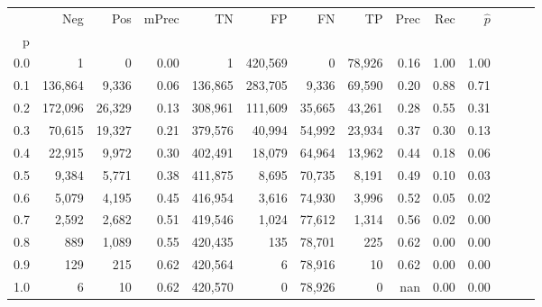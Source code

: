 \begin{tabular}{rrrrrrrrrrrrrr}
\toprule
{} &      Neg &     Pos & mPrec &       TN &       FP &      FN &      TP &  Prec &   Rec & $\hat{p}$ \\
p   &          &         &       &          &          &         &         &       &       &           \\
\midrule
0.0 &        1 &       0 &  0.00 &        1 &  420,569 &       0 &  78,926 &  0.16 &  1.00 &      1.00 \\
0.1 &  136,864 &   9,336 &  0.06 &  136,865 &  283,705 &   9,336 &  69,590 &  0.20 &  0.88 &      0.71 \\
0.2 &  172,096 &  26,329 &  0.13 &  308,961 &  111,609 &  35,665 &  43,261 &  0.28 &  0.55 &      0.31 \\
0.3 &   70,615 &  19,327 &  0.21 &  379,576 &   40,994 &  54,992 &  23,934 &  0.37 &  0.30 &      0.13 \\
0.4 &   22,915 &   9,972 &  0.30 &  402,491 &   18,079 &  64,964 &  13,962 &  0.44 &  0.18 &      0.06 \\
0.5 &    9,384 &   5,771 &  0.38 &  411,875 &    8,695 &  70,735 &   8,191 &  0.49 &  0.10 &      0.03 \\
0.6 &    5,079 &   4,195 &  0.45 &  416,954 &    3,616 &  74,930 &   3,996 &  0.52 &  0.05 &      0.02 \\
0.7 &    2,592 &   2,682 &  0.51 &  419,546 &    1,024 &  77,612 &   1,314 &  0.56 &  0.02 &      0.00 \\
0.8 &      889 &   1,089 &  0.55 &  420,435 &      135 &  78,701 &     225 &  0.62 &  0.00 &      0.00 \\
0.9 &      129 &     215 &  0.62 &  420,564 &        6 &  78,916 &      10 &  0.62 &  0.00 &      0.00 \\
1.0 &        6 &      10 &  0.62 &  420,570 &        0 &  78,926 &       0 &   nan &  0.00 &      0.00 \\
\bottomrule
\end{tabular}
